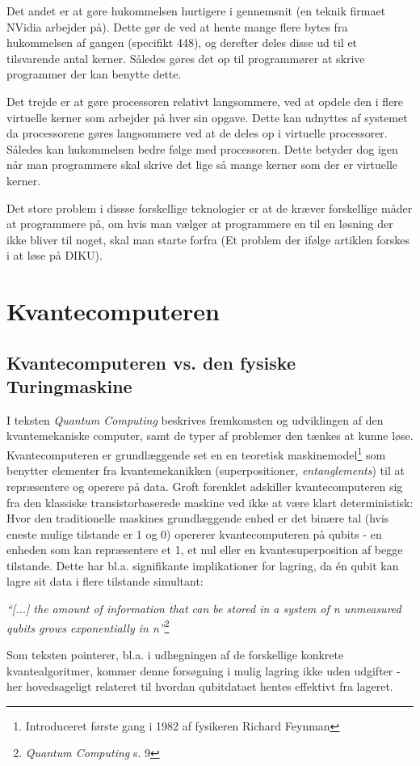 \documentclass[10pt,a4paper]{article}
\newcommand{\citat}[2]{\begin{justify}\textit{``#1''}\hspace{0.1cm}\footnote{#2}\end{justify}}
\begin{document}
Det andet er at gøre hukommelsen hurtigere i gennemsnit (en teknik firmaet
NVidia arbejder på). Dette gør de ved at hente mange flere bytes fra hukommelsen
af gangen (specifikt 448), og derefter deles disse ud til et tilsvarende antal
kerner. Således gøres det op til programmører at skrive programmer der kan
benytte dette.

Det trejde er at gøre processoren relativt langsommere, ved at opdele den i
flere virtuelle kerner som arbejder på hver sin opgave. Dette kan udnyttes af
systemet da processorene gøres langsommere ved at de deles op i virtuelle
processorer. Således kan hukommelsen bedre følge med processoren. Dette betyder
dog igen når man programmere skal skrive det lige så mange kerner som der er
virtuelle kerner.

Det store problem i dissse forskellige teknologier er at de kræver forskellige
måder at programmere på, om hvis man vælger at programmere en til en løsning der
ikke bliver til noget, skal man starte forfra (Et problem der ifølge artiklen
forskes i at løse på DIKU).

\section{Kvantecomputeren}
\subsection{Kvantecomputeren vs. den fysiske Turingmaskine}
I teksten \textit{Quantum Computing} beskrives fremkomsten og udviklingen 
af den kvantemekaniske computer, samt de typer af problemer den tænkes at
kunne løse.
Kvantecomputeren er grundlæggende set en en teoretisk maskinemodel\footnote{
Introduceret første gang i 1982 af fysikeren Richard Feynman} som benytter 
elementer fra kvantemekanikken (superpositioner, \textit{entanglements}) til 
at repræsentere og operere på data. Groft forenklet adskiller kvantecomputeren
sig fra den klassiske transistorbaserede maskine ved ikke at være klart
deterministisk: Hvor den traditionelle maskines grundlæggende enhed er det binære 
tal (hvis eneste mulige tilstande er 1 og 0) opererer kvantecomputeren på qubits
- en enheden som kan repræsentere et 1, et nul eller en kvantesuperposition af 
begge tilstande. Dette har bl.a. signifikante implikationer for lagring, da én qubit 
kan lagre sit data i flere tilstande simultant: 
\citat{[...] the amount of information that can be stored in a system of  
\textit{n} unmeasured qubits grows exponentially in \textit{n}}{\textit{Quantum Computing} s. 9}
Som teksten 
pointerer, bl.a. i udlægningen af de forskellige konkrete kvantealgoritmer, 
kommer denne forsøgning i mulig lagring ikke uden udgifter - her hovedsageligt 
relateret til hvordan qubitdataet hentes effektivt fra lageret. 
\end{document}
